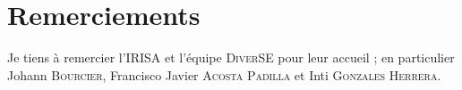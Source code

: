 \section*{Remerciements}

\begin{flushright}
Je tiens à remercier l'\textsc{IRISA} et l'équipe \textsc{DiverSE} pour leur accueil ; en particulier Johann \textsc{Bourcier}, Francisco Javier \textsc{Acosta Padilla} et Inti \textsc{Gonzales Herrera}.
\end{flushright}
